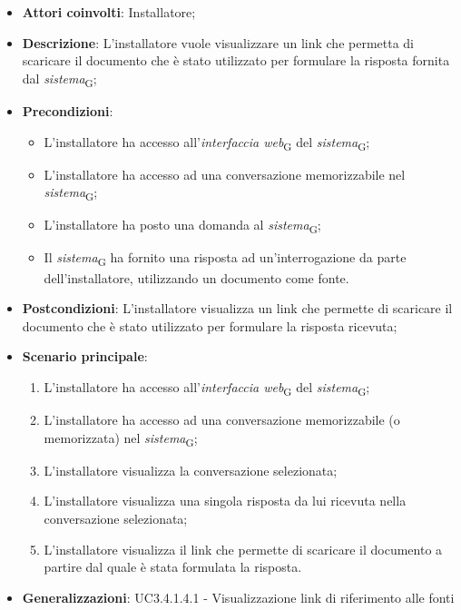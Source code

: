 \begin{itemize}
    \item \textbf{Attori coinvolti}: Installatore;
    \item \textbf{Descrizione}: L'installatore vuole visualizzare un link che permetta di scaricare il documento che è stato utilizzato per formulare la risposta fornita dal \textit{sistema}\textsubscript{G};
    \item \textbf{Precondizioni}: 
    \begin{itemize}
        \item L’installatore ha accesso all’\textit{interfaccia web}\textsubscript{G} del \textit{sistema}\textsubscript{G};
        \item L’installatore ha accesso ad una conversazione memorizzabile nel \textit{sistema}\textsubscript{G};
        \item L'installatore ha posto una domanda al \textit{sistema}\textsubscript{G};
        \item Il \textit{sistema}\textsubscript{G} ha fornito una risposta ad un’interrogazione da parte dell’installatore, utilizzando un documento come fonte.
    \end{itemize}
    \item \textbf{Postcondizioni}: L'installatore visualizza un link che permette di scaricare il documento che è stato utilizzato per formulare la risposta ricevuta;
    \item \textbf{Scenario principale}:
    \begin{enumerate}
        \item L’installatore ha accesso all’\textit{interfaccia web}\textsubscript{G} del \textit{sistema}\textsubscript{G};
        \item L’installatore ha accesso ad una conversazione memorizzabile (o memorizzata) nel \textit{sistema}\textsubscript{G};
        \item L'installatore visualizza la conversazione selezionata;
        \item L'installatore visualizza una singola risposta da lui ricevuta nella conversazione selezionata;
        \item L'installatore visualizza il link che permette di scaricare il documento a partire dal quale è stata formulata la risposta.
    \end{enumerate}
    \item \textbf{Generalizzazioni}: UC3.4.1.4.1 - Visualizzazione link di riferimento alle fonti
\end{itemize}

